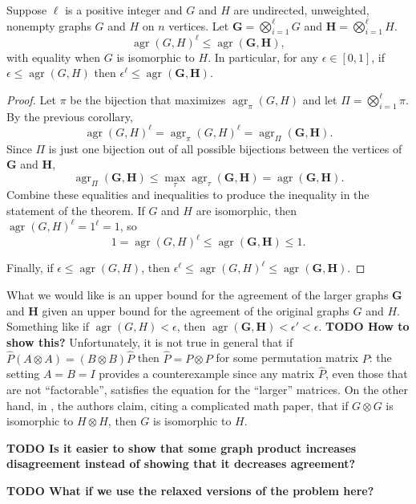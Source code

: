 \documentclass{article}
\newcommand{\todo}[1]{\textbf{TODO #1}}
\newcommand{\1}{\mathbf{1}}
\DeclareMathOperator{\agr}{agr}
\begin{document}
\begin{theorem}
  Suppose $\ell$ is a positive integer and $G$ and $H$ are undirected, unweighted, nonempty graphs $G$ and $H$ on $n$ vertices.
  Let $\mathbf{G} = \bigotimes_{i = 1}^\ell G$ and $\mathbf{H} = \bigotimes_{i = 1}^\ell H$.
  \begin{equation*}
    \agr(G, H)^\ell \leq \agr(\mathbf{G}, \mathbf{H}),
  \end{equation*}
  with equality when $G$ is isomorphic to $H$.
  In particular, for any $\epsilon \in [0, 1]$, if $\epsilon \leq \agr(G, H)$ then $\epsilon^\ell \leq \agr(\mathbf{G}, \mathbf{H})$.
\end{theorem}
\begin{proof}
  Let $\pi$ be the bijection that maximizes $\agr_\pi(G, H)$ and let $\Pi = \bigotimes_{i = 1}^\ell \pi$.
  By the previous corollary,
  \begin{equation*}
    \agr(G, H)^\ell = \agr_\pi(G, H)^\ell = \agr_\Pi(\mathbf{G}, \mathbf{H}).
  \end{equation*}
  Since $\Pi$ is just one bijection out of all possible bijections between the vertices of $\mathbf{G}$ and $\mathbf{H}$,
  \begin{equation*}
    \agr_\Pi(\mathbf{G}, \mathbf{H}) \leq \max_\tau \agr_\tau(\mathbf{G}, \mathbf{H}) = \agr(\mathbf{G}, \mathbf{H}).
  \end{equation*}
  Combine these equalities and inequalities to produce the inequality in the statement of the theorem.
  If $G$ and $H$ are isomorphic, then $\agr(G, H)^\ell = 1^\ell = 1$, so
  \begin{equation*}
    1 = \agr(G, H)^\ell \leq \agr(\mathbf{G}, \mathbf{H}) \leq 1.
  \end{equation*}

  Finally, if $\epsilon \leq \agr(G, H)$, then $\epsilon^\ell \leq \agr(G, H)^\ell \leq \agr(\mathbf{G}, \mathbf{H})$.
\end{proof}

What we would like is an upper bound for the agreement of the larger graphs $\mathbf{G}$ and $\mathbf{H}$ given an upper bound for the agreement of the original graphs $G$ and $H$.
Something like if $\agr(G, H) < \epsilon$, then $\agr(\mathbf{G}, \mathbf{H}) < \epsilon' < \epsilon$.
\todo{How to show this?}
Unfortunately, it is not true in general that if $\hat{P}(A \otimes A) = (B \otimes B)\hat{P}$ then $\hat{P} = P \otimes P$ for some permutation matrix $P$: the setting $A = B = I$ provides a counterexample since any matrix $\hat{P}$, even those that are not ``factorable'', satisfies the equation for the ``larger'' matrices.
On the other hand, in \autocite{owwz14}, the authors claim, citing a complicated  math paper, that if $G \otimes G$ is isomorphic to $H \otimes H$, then $G$ is isomorphic to $H$.

\todo{Is it easier to show that some graph product increases disagreement instead of showing that it decreases agreement?}

\todo{What if we use the relaxed versions of the problem here?}

\printbibliography
\end{document}
